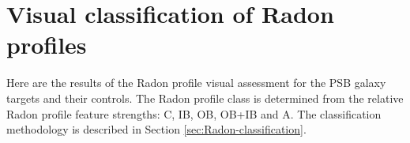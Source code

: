 \onecolumn

\section{Visual classification of Radon profiles}
\label{sec:visual-classification-tables}


Here are the results of the Radon profile visual assessment for the PSB galaxy targets and their controls. The Radon profile class is determined from the relative Radon profile feature strengths: C, IB, OB, OB+IB and A. The classification methodology is described in Section \ref{sec:Radon-classification}.


